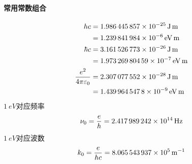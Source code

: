 \paragraph{常用常数组合}
\begin{align}
	hc&=\SI{1.986445857E-25}{J.m}\\ %
	&=\SI{1.239841984E-6}{eV.m}\\  %
	\hbar c&=\SI{3.161526773E-26}{J.m}\\ %
	&=\SI{1.97326980459E-7}{eV.m}\\ %
	\frac{e^2}{4\pi\varepsilon_0}&=\SI{2.307077552E-28}{J.m}\\ %
	&=\SI{1.4399645478E-9}{eV.m} %
\end{align}
$\SI{1}{eV}$对应频率
\begin{equation}
	\nu_0=\frac eh=\SI{2.417989242E14}{Hz}
\end{equation} %
$\SI{1}{eV}$对应波数
\begin{equation}
	k_0=\frac e{hc}=\SI{8.065543937E5}{m^{-1}}
\end{equation} %
